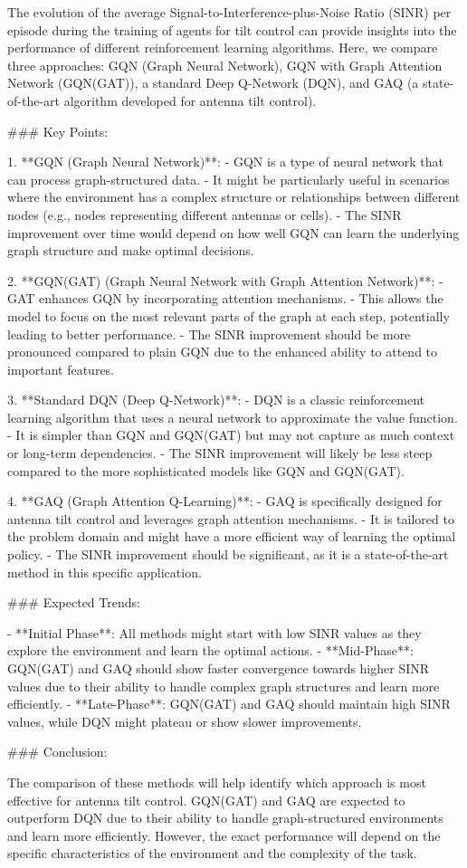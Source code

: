 The evolution of the average Signal-to-Interference-plus-Noise Ratio (SINR) per episode during the training of agents for tilt control can provide insights into the performance of different reinforcement learning algorithms. Here, we compare three approaches: GQN (Graph Neural Network), GQN with Graph Attention Network (GQN(GAT)), a standard Deep Q-Network (DQN), and GAQ (a state-of-the-art algorithm developed for antenna tilt control).

### Key Points:

1. **GQN (Graph Neural Network)**:
   - GQN is a type of neural network that can process graph-structured data.
   - It might be particularly useful in scenarios where the environment has a complex structure or relationships between different nodes (e.g., nodes representing different antennas or cells).
   - The SINR improvement over time would depend on how well GQN can learn the underlying graph structure and make optimal decisions.

2. **GQN(GAT) (Graph Neural Network with Graph Attention Network)**:
   - GAT enhances GQN by incorporating attention mechanisms.
   - This allows the model to focus on the most relevant parts of the graph at each step, potentially leading to better performance.
   - The SINR improvement should be more pronounced compared to plain GQN due to the enhanced ability to attend to important features.

3. **Standard DQN (Deep Q-Network)**:
   - DQN is a classic reinforcement learning algorithm that uses a neural network to approximate the value function.
   - It is simpler than GQN and GQN(GAT) but may not capture as much context or long-term dependencies.
   - The SINR improvement will likely be less steep compared to the more sophisticated models like GQN and GQN(GAT).

4. **GAQ (Graph Attention Q-Learning)**:
   - GAQ is specifically designed for antenna tilt control and leverages graph attention mechanisms.
   - It is tailored to the problem domain and might have a more efficient way of learning the optimal policy.
   - The SINR improvement should be significant, as it is a state-of-the-art method in this specific application.

### Expected Trends:

- **Initial Phase**: All methods might start with low SINR values as they explore the environment and learn the optimal actions.
- **Mid-Phase**: GQN(GAT) and GAQ should show faster convergence towards higher SINR values due to their ability to handle complex graph structures and learn more efficiently.
- **Late-Phase**: GQN(GAT) and GAQ should maintain high SINR values, while DQN might plateau or show slower improvements.

### Conclusion:

The comparison of these methods will help identify which approach is most effective for antenna tilt control. GQN(GAT) and GAQ are expected to outperform DQN due to their ability to handle graph-structured environments and learn more efficiently. However, the exact performance will depend on the specific characteristics of the environment and the complexity of the task.